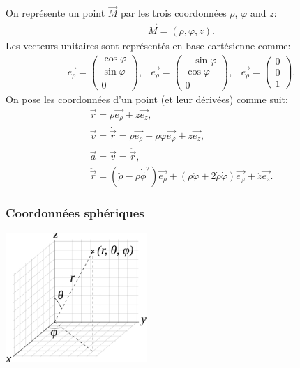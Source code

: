 \begin{multicols}{2}
    On représente un point $\vec{M}$ par les trois coordonnées $\rho$, $\varphi$ and $z$:
    \begin{align*}
        \vec{M} = (\rho, \varphi, z).
    \end{align*}
    Les vecteurs unitaires sont représentés en base cartésienne comme:
    \begin{align*}
        \vec{e_\rho} = \begin{pmatrix} 
            \cos \varphi \\
            \sin \varphi \\
            0
        \end{pmatrix}, & 
        \vec{e_\rho} = \begin{pmatrix} 
            - \sin \varphi \\
            \cos \varphi \\
            0
        \end{pmatrix}, & 
        \vec{e_\rho} = \begin{pmatrix} 
            0 \\
            0 \\
            1
        \end{pmatrix}.
    \end{align*}
    On pose les coordonnées d'un point (et leur dérivées) comme suit: 
    \begin{align*}
        \vec{r} = \rho \vec{e_\rho} + z \vec{e_z}, \\
        \vec{v} = \dot{\vec{r}} = \dot{\rho} \vec{e_\rho} + \rho \dot{\varphi} \vec{e_\varphi} + \dot{z} \vec{e_z}, \\
        \vec{a} = \dot{\vec{v}} = \ddot{\vec{r}}, \\
        \ddot{\vec{r}} = (\ddot{\rho} - \rho \dot{\phi}^2) \vec{e_\rho} + (\rho \ddot{\varphi} + 2 \dot{\rho} \dot{\varphi}) \vec{e_\varphi} + \ddot{z} \vec{e_z}.
    \end{align*}
    
    \subsubsection*{Coordonnées sphériques}

    \begin{center}
        \includegraphics[width=0.4\textwidth]{figures/spheriques.png}
    \end{center}
        


\end{multicols}
